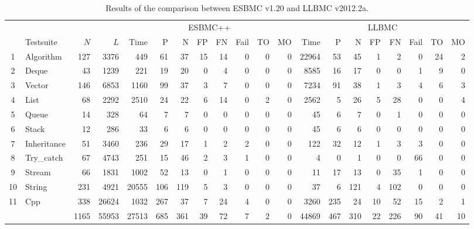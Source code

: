 \documentclass[conference]{IEEEtran}
\begin{document}
\begin{table}[t!]
\begin{adjustwidth}{-0.5cm}{}
\renewcommand\arraystretch{1.18}
\setlength{\tabcolsep}{4pt}
\begin{center} {\small
\begin{tabular}{|c|l|r|r||r|r|r|r|r|r|r|r|r|r|r|r|r|r|r|r|}
\hline
  & & & & \multicolumn{8}{c|}{ESBMC++}
        & \multicolumn{8}{c|}{LLBMC} \\  \cline{5-20}
  & Testsuite   & $N$  & $L$   & Time  & P    & N   & FP  & FN   & Fail & TO   & MO    & Time   & P   & N   & FP  & FN  & Fail & TO  & MO \\\hline
1 & Algorithm   & 127  & 3376  & 449   & 61   & 37  & 15  & 14   & 0    & 0    & 0     & 22964  & 53  & 45  & 1   & 2   & 0    & 24  & 2\\ %
\hline
2 & Deque       & 43   & 1239  & 221   & 19   & 20  & 0   & 4    & 0    & 0    & 0     & 8585   & 16  & 17  & 0   & 0   & 1    & 9   & 0\\ %
\hline
3 & Vector      & 146  & 6853  & 1160  & 99   & 37  & 3   & 7    & 0    & 0    & 0     & 7234   & 91  & 38  & 1   & 3   & 4    & 6   & 3\\ %
\hline
4 & List        & 68   & 2292  & 2510  & 24   & 22  & 6   & 14   & 0    & 2    & 0     & 2562   & 5   & 26  & 5   & 28  & 0    & 0   & 4\\ %
\hline
5 & Queue       & 14   & 328   & 64    & 7    & 7   & 0   & 0    & 0    & 0    & 0     & 45     & 6   & 7   & 0   & 1   & 0    & 0   & 0\\ %
\hline
6 & Stack       & 12   & 286   & 33    & 6    & 6   & 0   & 0    & 0    & 0    & 0     & 45     & 6   & 6   & 0   & 0   & 0    & 0   & 0\\ %
\hline
7 & Inheritance & 51   & 3460  & 236   & 29   & 17  & 1   & 2    & 2    & 0    & 0     & 122    & 32  & 12  & 1   & 3   & 3    & 0   & 0\\ %
\hline
8 & Try\_catch  & 67   & 4743  & 251   & 15   & 46  & 2   & 3    & 1    & 0    & 0     & 4      & 0   & 1   & 0   & 0   & 66   & 0   & 0 \\ %
\hline
9 & Stream      & 66   & 1831  & 1002  & 52   & 13  & 0   & 1    & 0    & 0    & 0     & 11     & 17  & 13  & 0   & 35  & 1    & 0   & 0\\ %
\hline
10 & String     & 231  & 4921  & 20555 & 106  & 119 & 5   & 3    & 0    & 0    & 0     & 37     & 6   & 121 & 4   & 102 & 0    & 0   & 0\\ %
\hline
11 & Cpp        & 338  & 26624 & 1032  & 267  & 37  & 7   & 24   & 4    & 0    & 0     & 3260   & 235 & 24  & 10  & 52  & 15   & 2   & 1\\ %
\hline\hline
  &             & 1165 & 55953 & 27513 & 685  & 361   & 39   & 72  & 7  & 2    & 0     & 44869  & 467 & 310 & 22  & 226 & 90   & 41  & 10\\ %
\hline
\end{tabular} }
\end{center}
\caption{Results of the comparison between ESBMC v1.20 and LLBMC v2012.2a.}
\label{table:results-of-the-comparison-between-ESBMC-and-LLBMC}
\end{adjustwidth}
\end{table}
\end{document}
